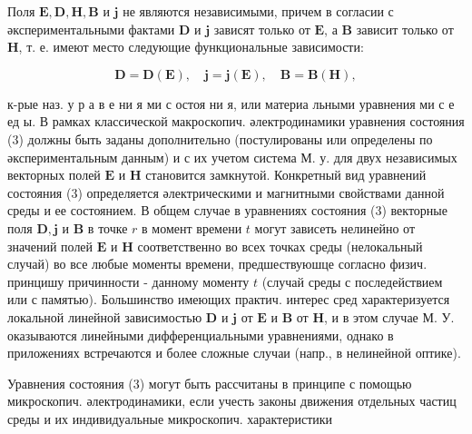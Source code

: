 \documentclass[10pt]{article}
\begin{document}
Поля $\boldsymbol{E}, \boldsymbol{D}, \boldsymbol{H}, \boldsymbol{B}$ и $\boldsymbol{j}$ не являются независимыми, причем в согласии с әкспериментальными фактами $\boldsymbol{D}$ и $\boldsymbol{j}$ зависят только от $\boldsymbol{E}$, а $\boldsymbol{B}$ зависит только от $\boldsymbol{H}$, т. е. имеют место следующие функциональные зависимости:



\[

\boldsymbol{D}=\boldsymbol{D}(\boldsymbol{E}), \quad \boldsymbol{j}=\boldsymbol{j}(\boldsymbol{E}), \quad \boldsymbol{B}=\boldsymbol{B}(\boldsymbol{H}),

\]



к-рые наз. у р а в е ни я ми с остоя ни я, или материа льными уравнения ми с е ед ы. В рамках классической макроскопич. әлектродинамики уравнения состояния (3) должны быть заданы дополнительно (постулированы или определены по әкспериментальным данным) и с их учетом система М. у. для двух независимых векторных полей $\boldsymbol{E}$ и $\boldsymbol{H}$ становится замкнутой. Конкретный вид уравнений состояния (3) определяется әлектрическими и магнитными свойствами данной среды и ее состоянием. В общем случае в уравнениях состояния (3) векторные поля $\boldsymbol{D}, \boldsymbol{j}$ и $\boldsymbol{B}$ в точке $r$ в момент времени $t$ могут зависеть нелинейно от значений полей $\boldsymbol{E}$ и $\boldsymbol{H}$ соответственно во всех точках среды (нелокальный случай) во все любые моменты времени, предшествуюшце согласно физич. принцишу причинности - данному моменту $t$ (случай среды с последействием или с памятью). Большинство имеющих практич. интерес сред характеризуется локальной линейной зависимостью $\boldsymbol{D}$ и $\boldsymbol{j}$ от $\boldsymbol{E}$ и $\boldsymbol{B}$ от $\boldsymbol{H}$, и в этом случае М. У. оказываются линейными дифференциальными уравнениями, однако в приложениях встречаются и более сложные случаи (напр., в нелинейной оптике).



Уравнения состояния (3) могут быть рассчитаны в принципе с помощью микроскопич. әлектродинамики, если учесть законы движения отдельных частиц среды и их индивидуальные микроскопич. характеристики
\end{document}
